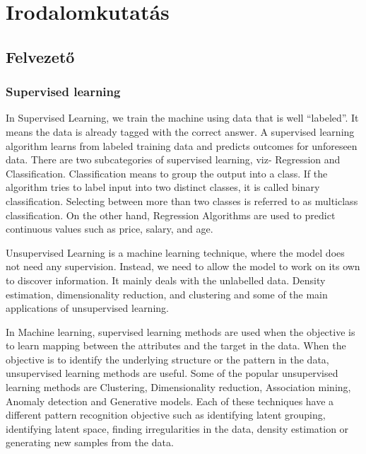 \section{Irodalomkutatás}

\subsection{Felvezető}

\subsubsection{Supervised learning}

In Supervised Learning, we train the machine using data that is well “labeled”. It means the data is already tagged with the correct answer. A supervised learning algorithm learns from labeled training data and predicts outcomes for unforeseen data. There are two subcategories of supervised learning, viz- Regression and Classification.
Classification means to group the output into a class. If the algorithm tries to label input into two distinct classes, it is called binary classification. Selecting between more than two classes is referred to as multiclass classification. On the other hand, Regression Algorithms are used to predict continuous values such as price, salary, and age.

Unsupervised Learning is a machine learning technique, where the model does not need any supervision. Instead, we need to allow the model to work on its own to discover information. It mainly deals with the unlabelled data. Density estimation, dimensionality reduction, and clustering and some of the main applications of unsupervised learning.

In Machine learning, supervised learning methods are used when the objective is to learn mapping between the attributes and the target in the data. When the objective is to identify the underlying structure or the pattern in the data, unsupervised learning methods are useful. Some of the popular unsupervised learning methods are Clustering, Dimensionality reduction, Association mining, Anomaly detection and Generative models. Each of these techniques have a different pattern recognition objective such as identifying latent grouping, identifying latent space, finding irregularities in the data, density estimation or generating new samples from the data. 

